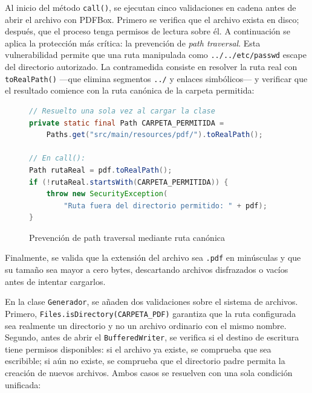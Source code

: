 Al inicio del método \texttt{call()}, se ejecutan cinco validaciones en cadena antes de abrir
el archivo con PDFBox. Primero se verifica que el archivo exista en disco; después, que el
proceso tenga permisos de lectura sobre él. A continuación se aplica la protección más crítica:
la prevención de \textit{path traversal}. Esta vulnerabilidad permite que una ruta manipulada
como \texttt{../../etc/passwd} escape del directorio autorizado. La contramedida consiste en
resolver la ruta real con \texttt{toRealPath()} —que elimina segmentos \texttt{../} y
enlaces simbólicos— y verificar que el resultado comience con la ruta canónica de la carpeta
permitida:

\begin{figure}[H]
    \centering
    \begin{minipage}{0.9\textwidth}
    \caption{Prevención de path traversal mediante ruta canónica}
    \label{code:secure-path-traversal}
    \vspace{-0.2cm}
    \begin{lstlisting}[language=Java, basicstyle=\scriptsize\ttfamily]
// Resuelto una sola vez al cargar la clase
private static final Path CARPETA_PERMITIDA =
    Paths.get("src/main/resources/pdf/").toRealPath();

// En call():
Path rutaReal = pdf.toRealPath();
if (!rutaReal.startsWith(CARPETA_PERMITIDA)) {
    throw new SecurityException(
        "Ruta fuera del directorio permitido: " + pdf);
}
    \end{lstlisting}
    \end{minipage}
\end{figure}

Finalmente, se valida que la extensión del archivo sea \texttt{.pdf} en minúsculas y que su
tamaño sea mayor a cero bytes, descartando archivos disfrazados o vacíos antes de intentar
cargarlos.

En la clase \texttt{Generador}, se añaden dos validaciones sobre el sistema de archivos.
Primero, \texttt{Files.isDirectory(CARPETA\_PDF)} garantiza que la ruta configurada sea
realmente un directorio y no un archivo ordinario con el mismo nombre. Segundo, antes de
abrir el \texttt{BufferedWriter}, se verifica si el destino de escritura tiene permisos
disponibles: si el archivo ya existe, se comprueba que sea escribible; si aún no existe,
se comprueba que el directorio padre permita la creación de nuevos archivos. Ambos casos
se resuelven con una sola condición unificada:

